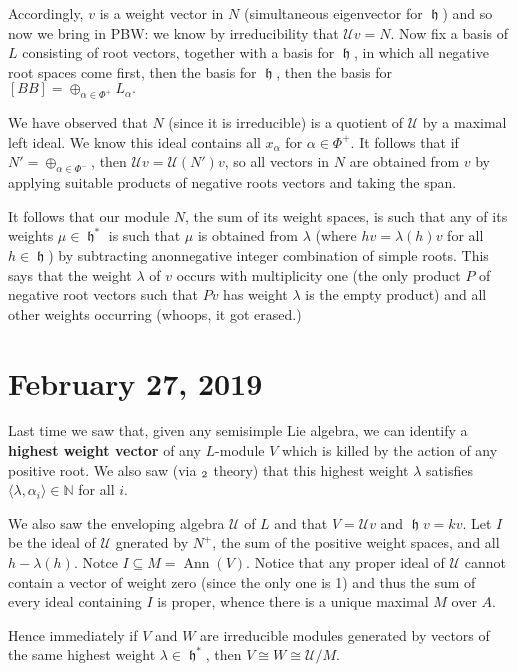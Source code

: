 \documentclass[12pt]{article}
\theoremstyle{nonumberbreak}
\theoremstyle{changebreak}
\theoremstyle{nonumberbreak}
\theoremstyle{change}
\newcommand*{\N}{
\mathbb{N}
}
\let\sl\relax
\DeclareMathOperator{\sl}{\mathfrak{sl}}
\DeclareMathOperator{\h}{\mathfrak{h}}
\begin{document}
Accordingly, $v$ is a weight vector in $N$ (simultaneous eigenvector for $\h$) and so now we bring in PBW:
we know by irreducibility that $\mathcal U v=N$. Now fix a basis of $L$ consisting of root vectors, together 
with a basis for $\h$, in which all negative root spaces come first, then the basis for $\h$, then the basis for $[BB]=\oplus_{\alpha\in\Phi^+}L_\alpha.$

We have observed that $N$ (since it is irreducible) is a quotient of $\mathcal U$ by a maximal left ideal. We 
know this ideal contains all $x_\alpha$ for $\alpha\in\Phi^+$. It follows that if $N'=\oplus_{\alpha\in\Phi^-}$,
then $\mathcal Uv=\mathcal U(N')v$, so all vectors in $N$ are obtained from $v$ by applying suitable products of 
negative roots vectors and taking the span.

It follows that our module $N$, the sum of its weight spaces, is such that any of its weights $\mu\in\h^*$
is such that $\mu$ is obtained from $\lambda$ (where $hv=\lambda(h) v$ for all $h\in\h$) by subtracting anonnegative integer combination
of simple roots. This says that the weight $\lambda$ of $v$ occurs with multiplicity one (the only product $P$ of negative root vectors such that
$Pv$ has weight $\lambda$ is the empty product) and all other weights occurring (whoops, it got erased.)

\section{February 27, 2019}
Last time we saw that, given any semisimple Lie algebra, we can identify a \textbf{highest weight vector} of any $L$-module $V$
which is killed by the action of any positive root. We also saw (via $\sl_2$ theory) that this highest weight $\lambda$ satisfies
$\langle\lambda, \alpha_i\rangle\in\N$ for all $i$.

We also saw the enveloping algebra $\mathcal U$ of $L$ and that $V=\mathcal Uv$ and $\h v=kv$. Let $I$ be the ideal of $\mathcal U$ gnerated by $N^+$,
the sum of the positive weight spaces, and all $h-\lambda(h)$. Notce $I\subseteq M=\operatorname{Ann}(V).$
Notice that any proper ideal of $\mathcal U$ cannot contain a vector of weight zero (since the only one is 1)
and thus the sum of every ideal containing $I$ is proper, whence there is a unique maximal $M$ over $A$.

Hence immediately if $V$ and $W$ are irreducible modules generated by vectors of the same highest weight $\lambda\in\h^*$,
then $V\cong W\cong \mathcal U/M$. 
\end{document}
